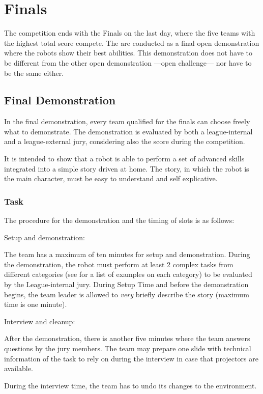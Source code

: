 \chapter{Finals}

The competition ends with the Finals on the last day, where the five teams with the highest total score compete. The  are conducted as a final open demonstration where the robots show their best abilities. This demonstration does not have to be different from the other open demonstration ---open challenge--- nor have to be the same either.

\section{Final Demonstration}

In the final demonstration, every team qualified for the finals can choose freely what to demonstrate. The demonstration is evaluated by both a league-internal and a league-external jury, considering also the score during the competition.

It is intended to show that a robot is able to perform a set of advanced skills integrated into a simple story driven at home. The story, in which the robot is the main character, must be easy to understand and self explicative.

\subsection{Task}
The procedure for the demonstration and the timing of slots is as follows:
\begin{enumerate}
  {\bf\item Setup and demonstration:} The team has a maximum of ten minutes for setup and demonstration. During the demonstration, the robot must perform at least 2 complex tasks from different categories (see for a list of examples on each category) to be evaluated by the League-internal jury. During Setup Time and before the demonstration begins, the team leader is allowed to \emph{very} briefly describe the story (maximum time is one minute). \\
  {\bf\item Interview and cleanup:} After the demonstration, there is another five minutes where the team answers questions by the jury members. The team may prepare one slide with technical information of the task to rely on during the interview in case that projectors are available.

  During the interview time, the team has to undo its changes to the environment.
\end{enumerate}

